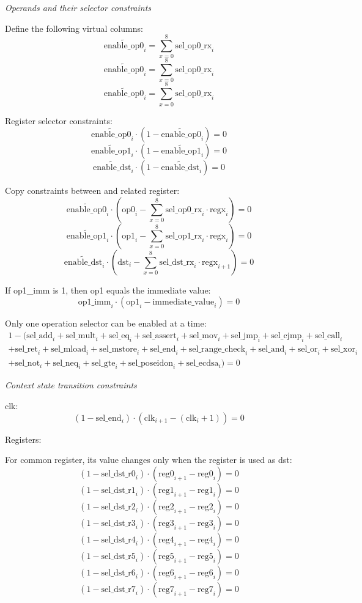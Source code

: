 \emph{Operands and their selector constraints}

Define the following virtual columns:
\[ \widetilde{\mathrm{enable\_op0}}_i=\sum_{x=0}^8 \mathrm{sel\_op0\_rx}_i \]
\[ \widetilde{\mathrm{enable\_op0}}_i=\sum_{x=0}^8 \mathrm{sel\_op0\_rx}_i \]
\[ \widetilde{\mathrm{enable\_op0}}_i=\sum_{x=0}^8 \mathrm{sel\_op0\_rx}_i \]

Register selector constraints:
\[ \widetilde{\mathrm{enable\_op0}}_i \cdot (1-\widetilde{\mathrm{enable\_op0}}_i)=0 \]
\[ \widetilde{\mathrm{enable\_op1}}_i \cdot (1-\widetilde{\mathrm{enable\_op1}}_i)=0 \]
\[ \widetilde{\mathrm{enable\_dst}}_i \cdot (1-\widetilde{\mathrm{enable\_dst}}_i)=0 \]

Copy constraints between and related register:
\[ \widetilde{\mathrm{enable\_op0}}_i \cdot (\mathrm{op0}_i-\sum_{x=0}^8 \mathrm{sel\_op0\_rx}_i \cdot \mathrm{regx}_i)=0 \]
\[ \widetilde{\mathrm{enable\_op1}}_i \cdot (\mathrm{op1}_i-\sum_{x=0}^8 \mathrm{sel\_op1\_rx}_i \cdot \mathrm{regx}_i)=0 \]
\[ \widetilde{\mathrm{enable\_dst}}_i \cdot (\mathrm{dst}_i-\sum_{x=0}^8 \mathrm{sel\_dst\_rx}_i \cdot \mathrm{regx}_{i+1})=0 \]

If op1\_imm is 1, then op1 equals the immediate value:
\[ \mathrm{op1\_imm}_i \cdot (\mathrm{op1}_i - \mathrm{immediate\_value}_i)=0 \]

Only one operation selector can be enabled at a time:
\begin{multline*}
    1 - (\mathrm{sel\_add}_i + \mathrm{sel\_mult}_i + \mathrm{sel\_eq}_i + \mathrm{sel\_assert}_i + \mathrm{sel\_mov}_i + \mathrm{sel\_jmp}_i + \mathrm{sel\_cjmp}_i + \mathrm{sel\_call}_i \\
    + \mathrm{sel\_ret}_i + \mathrm{sel\_mload}_i + \mathrm{sel\_mstore}_i + \mathrm{sel\_end}_i + \mathrm{sel\_range\_check}_i + \mathrm{sel\_and}_i + \mathrm{sel\_or}_i + \mathrm{sel\_xor}_i \\
    + \mathrm{sel\_not}_i + \mathrm{sel\_neq}_i + \mathrm{sel\_gte}_i + \mathrm{sel\_poseidon}_i + \mathrm{sel\_ecdsa}_i) = 0
\end{multline*}

\emph{Context state transition constraints}

clk:
\[ (1 - \mathrm{sel\_end}_i) \cdot (\mathrm{clk}_{i+1} - (\mathrm{clk}_i + 1))=0 \]

Registers:

For common register, its value changes only when the register is used as dst:
\[ (1 - \mathrm{sel\_dst\_r0}_i) \cdot (\mathrm{reg0}_{i+1} - \mathrm{reg0}_i) = 0 \]
\[ (1 - \mathrm{sel\_dst\_r1}_i) \cdot (\mathrm{reg1}_{i+1} - \mathrm{reg1}_i) = 0 \]
\[ (1 - \mathrm{sel\_dst\_r2}_i) \cdot (\mathrm{reg2}_{i+1} - \mathrm{reg2}_i) = 0 \]
\[ (1 - \mathrm{sel\_dst\_r3}_i) \cdot (\mathrm{reg3}_{i+1} - \mathrm{reg3}_i) = 0 \]
\[ (1 - \mathrm{sel\_dst\_r4}_i) \cdot (\mathrm{reg4}_{i+1} - \mathrm{reg4}_i) = 0 \]
\[ (1 - \mathrm{sel\_dst\_r5}_i) \cdot (\mathrm{reg5}_{i+1} - \mathrm{reg5}_i) = 0 \]
\[ (1 - \mathrm{sel\_dst\_r6}_i) \cdot (\mathrm{reg6}_{i+1} - \mathrm{reg6}_i) = 0 \]
\[ (1 - \mathrm{sel\_dst\_r7}_i) \cdot (\mathrm{reg7}_{i+1} - \mathrm{reg7}_i) = 0 \]

